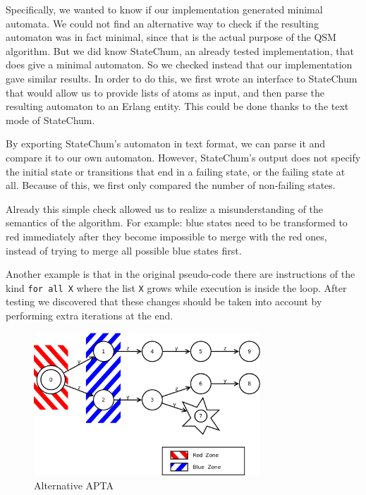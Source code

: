 \documentclass[]{sigplanconf}
\begin{document}
Specifically, we wanted to know if our implementation generated minimal
automata. We could not find an alternative way to check if the resulting
automaton was in fact minimal, since that is the actual purpose of the
QSM algorithm.
But we did know StateChum, an already tested implementation, that does give
a minimal automaton. So we checked instead that our implementation gave similar
results. In order to do this, we first wrote an interface to StateChum
that would allow us to provide lists of atoms as input, and then parse the
resulting automaton to an Erlang entity. This could be done thanks to the
text mode of StateChum.

By exporting StateChum's automaton in text format, we can parse it and
compare it to our own automaton. However, StateChum's output does not specify
the initial state or transitions that end in a failing state, or the failing
state at all. Because of this, we first only compared the number of 
non-failing states.

Already this simple check allowed us to realize a misunderstanding
of the semantics of the algorithm. For example: blue states need to
be transformed to red immediately after they become impossible to merge
with the red ones, instead of trying to merge all possible blue states
first.

Another example is that in the original pseudo-code there are
instructions of the kind \texttt{for all X} where the list \texttt{X}
grows while execution is inside the loop. After testing we
discovered that these changes should be taken into account by
performing extra iterations at the end.

\begin{figure}
\begin{center}
\includegraphics[width=8.5cm]{pictures/fsm5.pdf}
\end{center}
\caption{Alternative APTA}
\label{fsm5}
\end{figure}
\end{document}
